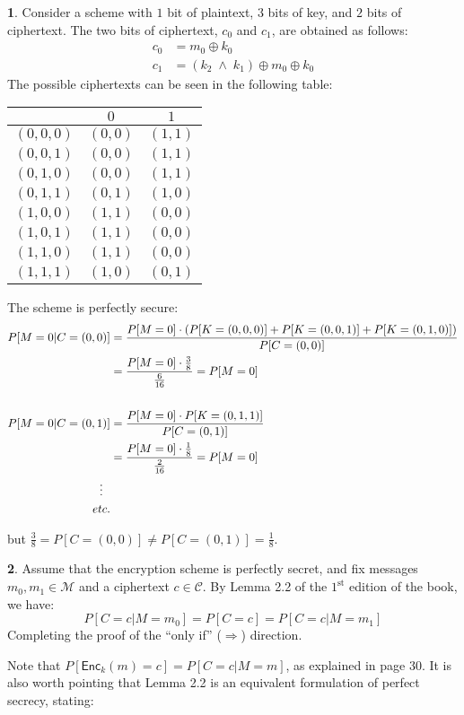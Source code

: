 \documentclass{article}
\theoremstyle{definition}
\newcommand{\AND}{\;\wedge\;}
\newcommand{\Enc}{\mathsf{Enc}}
\newcommand{\Ms}{\mathcal{M}} %
\newcommand{\Cs}{\mathcal{C}} %
\theoremstyle{definition}
\theoremstyle{definition}
\newtheorem{solution-internal}{}[subsection]
\newenvironment{solution}{
  \begin{solution-internal}
}{
  \end{solution-internal}
}
\begin{document}
\begin{solution}
  Consider a scheme with $1$ bit of plaintext, $3$ bits of key, and $2$ bits of
  ciphertext. The two bits of ciphertext, $c_0$ and $c_1$, are
  obtained as follows:
  \begin{align*}
    c_0 &= m_0 \oplus k_0 \\
    c_1 &= (k_2 \AND k_1) \oplus m_0 \oplus k_0
  \end{align*}
  The possible ciphertexts can be seen in the following table:
  \begin{table}
    \begin{tabular}{r|c|c}
       & $0$ & $1$ \\
      \hline
      $(0,0,0)$ & $(0,0)$ & $(1,1)$ \\
      $(0,0,1)$ & $(0,0)$ & $(1,1)$ \\
      $(0,1,0)$ & $(0,0)$ & $(1,1)$ \\
      $(0,1,1)$ & $(0,1)$ & $(1,0)$ \\
      $(1,0,0)$ & $(1,1)$ & $(0,0)$ \\
      $(1,0,1)$ & $(1,1)$ & $(0,0)$ \\
      $(1,1,0)$ & $(1,1)$ & $(0,0)$ \\
      $(1,1,1)$ & $(1,0)$ & $(0,1)$
    \end{tabular}
  \end{table}

  The scheme is perfectly secure:
  \begin{align*}
    P[M = 0|C = (0,0)] &= \frac{P[M = 0] \cdot \left(P[K = (0,0,0)] + P[K=(0,0,1)] + P[K=(0,1,0)]\right)}{P[C=(0,0)]} \\
                       &= \frac{P[M = 0] \cdot \frac{3}{8}}{\frac{6}{16}} =
    P[M=0] \\[16pt]
    P[M = 0|C = (0,1)] &= \frac{P[M = 0] \cdot P[K = (0,1,1)]}{P[C=(0,1)]}  \\
                       &= \frac{P[M = 0] \cdot \frac{1}{8}}{\frac{2}{16}} =
    P[M=0] \\
    \makebox[\widthof{etc.}]{\vdots} & \\
    etc. &
    \end{align*}
  
    but $\frac{3}{8} = P[C = (0,0)] \neq P[C=(0,1)] = \frac{1}{8}$.
\end{solution}

\begin{solution}
  Assume that the encryption scheme is perfectly secret, and fix messages $m_0,
  m_1 \in \Ms$ and a ciphertext $c \in \Cs$. By Lemma 2.2 of the $1^{\text{st}}$
  edition of the book, we have:
  \[ P[C=c | M = m_0] = P[C = c] = P[C = c | M = m_1] \]
  Completing the proof of the ``only if'' ($\Rightarrow$) direction.
\end{solution}
Note that $P[\Enc_k(m) = c] = P[C=c|M=m]$, as explained in page 30. It is also
worth pointing that Lemma 2.2 is an equivalent formulation of perfect secrecy, stating:
\end{document}
